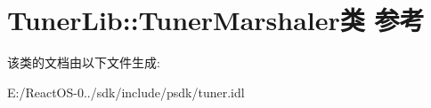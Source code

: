 \hypertarget{class_tuner_lib_1_1_tuner_marshaler}{}\section{Tuner\+Lib\+:\+:Tuner\+Marshaler类 参考}
\label{class_tuner_lib_1_1_tuner_marshaler}


该类的文档由以下文件生成\+:\begin{DoxyCompactItemize}
\item 
E\+:/\+React\+O\+S-\/0../sdk/include/psdk/tuner.\+idl\end{DoxyCompactItemize}

